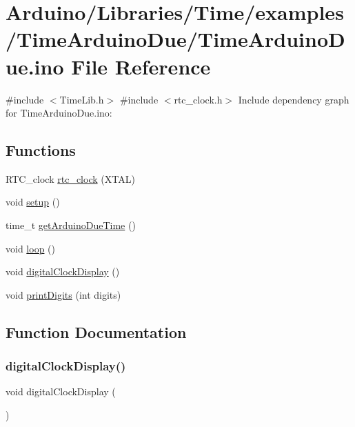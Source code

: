 \hypertarget{_time_arduino_due_8ino}{}\section{Arduino/\+Libraries/\+Time/examples/\+Time\+Arduino\+Due/\+Time\+Arduino\+Due.ino File Reference}
\label{_time_arduino_due_8ino}
{\ttfamily \#include $<$Time\+Lib.\+h$>$}\newline
{\ttfamily \#include $<$rtc\+\_\+clock.\+h$>$}\newline
Include dependency graph for Time\+Arduino\+Due.\+ino\+:
\subsection*{Functions}
\begin{DoxyCompactItemize}
\item 
R\+T\+C\+\_\+clock \hyperlink{_time_arduino_due_8ino_a4601f486d7787e36f06a427edb98e608}{rtc\+\_\+clock} (X\+T\+AL)
\item 
void \hyperlink{_time_arduino_due_8ino_a4fc01d736fe50cf5b977f755b675f11d}{setup} ()
\item 
time\+\_\+t \hyperlink{_time_arduino_due_8ino_a7e8debef424080b6b900e9dbc1bc6d3d}{get\+Arduino\+Due\+Time} ()
\item 
void \hyperlink{_time_arduino_due_8ino_afe461d27b9c48d5921c00d521181f12f}{loop} ()
\item 
void \hyperlink{_time_arduino_due_8ino_a01f3a72442d58926459c48afce4746e7}{digital\+Clock\+Display} ()
\item 
void \hyperlink{_time_arduino_due_8ino_a772afab0396032477ec7b01d14c774b2}{print\+Digits} (int digits)
\end{DoxyCompactItemize}


\subsection{Function Documentation}
\mbox{\label{_time_arduino_due_8ino_a01f3a72442d58926459c48afce4746e7}} 
\subsubsection{\texorpdfstring{digital\+Clock\+Display()}{digitalClockDisplay()}}
{\footnotesize\ttfamily void digital\+Clock\+Display (\begin{DoxyParamCaption}{ }\end{DoxyParamCaption})}

